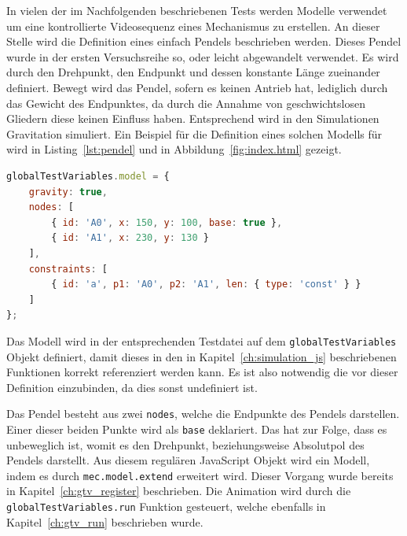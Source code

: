 In vielen der im Nachfolgenden beschriebenen Tests werden  Modelle verwendet um eine kontrollierte Videosequenz eines Mechanismus zu erstellen.
An dieser Stelle wird die Definition eines einfach Pendels beschrieben werden.
Dieses Pendel wurde in der ersten Versuchsreihe so, oder leicht abgewandelt verwendet.
Es wird durch den Drehpunkt, den Endpunkt und dessen konstante Länge zueinander definiert.
Bewegt wird das Pendel, sofern es keinen Antrieb hat, lediglich durch das Gewicht des Endpunktes, da durch die Annahme von geschwichtslosen Gliedern diese keinen Einfluss haben.
Entsprechend wird in den  Simulationen Gravitation simuliert.
Ein Beispiel für die Definition eines solchen Modells für  wird in Listing~\ref{lst:pendel} und in Abbildung~\ref{fig:index.html} gezeigt.

\begin{lstlisting}[language=JavaScript, caption={Definition eines einfachen Pendels in \name{mec2}, inklusive animation.}, label={lst:pendel}]
globalTestVariables.model = {
    gravity: true,
    nodes: [
        { id: 'A0', x: 150, y: 100, base: true },
        { id: 'A1', x: 230, y: 130 }
    ],
    constraints: [
        { id: 'a', p1: 'A0', p2: 'A1', len: { type: 'const' } }
    ]
};
\end{lstlisting}

Das  Modell wird in der entsprechenden Testdatei auf dem \lstinline{globalTestVariables} Objekt definiert, damit dieses in den in Kapitel~\ref{ch:simulation_js} beschriebenen Funktionen korrekt referenziert werden kann.
Es ist also notwendig die  vor dieser Definition einzubinden, da dies sonst undefiniert ist.

Das Pendel besteht aus zwei \lstinline{nodes}, welche die Endpunkte des Pendels darstellen.
Einer dieser beiden Punkte wird als \lstinline{base} deklariert.
Das hat zur Folge, dass es unbeweglich ist, womit es den Drehpunkt, beziehungsweise Absolutpol des Pendels darstellt.
Aus diesem regulären JavaScript Objekt wird ein  Modell, indem es durch \lstinline{mec.model.extend} erweitert wird.
Dieser Vorgang wurde bereits in Kapitel~\ref{ch:gtv_register} beschrieben.
Die Animation wird durch die \lstinline{globalTestVariables.run} Funktion gesteuert, welche ebenfalls in Kapitel~\ref{ch:gtv_run} beschrieben wurde.